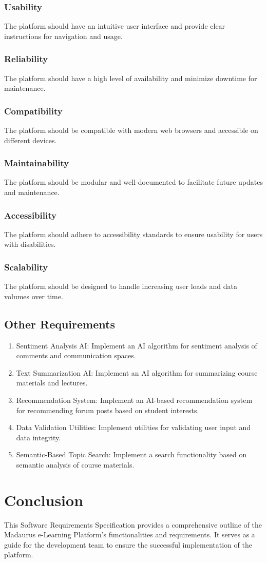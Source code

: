 \documentclass{IEEEtran}
\begin{document}
\subsubsection{Usability}
The platform should have an intuitive user interface and provide clear instructions for navigation and usage.

\subsubsection{Reliability}
The platform should have a high level of availability and minimize downtime for maintenance.

\subsubsection{Compatibility}
The platform should be compatible with modern web browsers and accessible on different devices.

\subsubsection{Maintainability}
The platform should be modular and well-documented to facilitate future updates and maintenance.

\subsubsection{Accessibility}
The platform should adhere to accessibility standards to ensure usability for users with disabilities.

\subsubsection{Scalability}
The platform should be designed to handle increasing user loads and data volumes over time.

\subsection{Other Requirements}
\begin{enumerate}[noitemsep]
\item Sentiment Analysis AI: Implement an AI algorithm for sentiment analysis of comments and communication spaces.
\item Text Summarization AI: Implement an AI algorithm for summarizing course materials and lectures.
\item Recommendation System: Implement an AI-based recommendation system for recommending forum posts based on student interests.
\item Data Validation Utilities: Implement utilities for validating user input and data integrity.
\item Semantic-Based Topic Search: Implement a search functionality based on semantic analysis of course materials.
\end{enumerate}

\section{Conclusion}
This Software Requirements Specification provides a comprehensive outline of the Madaurus e-Learning Platform's functionalities and requirements. It serves as a guide for the development team to ensure the successful implementation of the platform.
\end{document}
